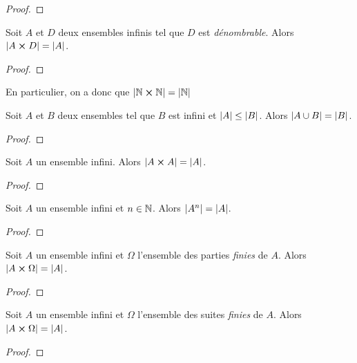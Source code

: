 \ifdefined\outputproof
\begin{proof}

\end{proof}
\fi

\begin{theorem}
	\label{thm:cartesian_product_denombrable_infini_infini}
	Soit $A$ et $D$ deux ensembles infinis tel que $D$ est \textit{dénombrable}.
	Alors $|A \cross D| = |A|$.
\end{theorem}

\ifdefined\outputproof
\begin{proof}

\end{proof}
\fi

En particulier, on a donc que $|\mathbb{N} \cross \mathbb{N}| = |\mathbb{N}|$

\begin{corollary}
	\label{cor:union_infini_set}
	Soit $A$ et $B$ deux ensembles tel que $B$ est infini et $|A| \leq |B|$.
	Alors $|A \cup B| = |B|$.
\end{corollary}

\ifdefined\outputproof
\begin{proof}

\end{proof}
\fi

\begin{theorem}
	Soit $A$ un ensemble infini. Alors $|A \cross A| = |A|$.
	\label{thm:card_cart_product_infini}
\end{theorem}

\ifdefined\outputproof
\begin{proof}

\end{proof}
\fi

\begin{corollary}
	Soit $A$ un ensemble infini et $n \in \mathbb{N}$. Alors $|A^{n}| =
	|A|$.
\end{corollary}

\ifdefined\outputproof
\begin{proof}

\end{proof}
\fi

\begin{corollary}
	Soit $A$ un ensemble infini et $\Omega$ l'ensemble des parties
	\textit{finies} de $A$. Alors $|A \cross \Omega| = |A|$.
\end{corollary}

\ifdefined\outputproof
\begin{proof}

\end{proof}
\fi

\begin{corollary}
	Soit $A$ un ensemble infini et $\Omega$ l'ensemble des suites
	\textit{finies} de $A$. Alors $|A \cross \Omega| = |A|$.
\end{corollary}

\ifdefined\outputproof
\begin{proof}

\end{proof}
\fi

